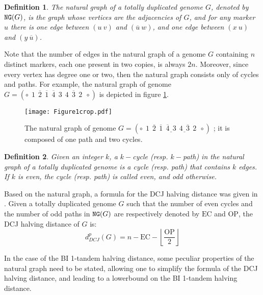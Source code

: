 \documentclass[11pt,final,twoside,nofrench]{thlifl}
\newcommand{\fst}[1]{ \ensuremath{#1} }
\newcommand{\snd}[1]{ \ensuremath{\overline{#1}} }
\newcommand\aff[2]{\ensuremath{(\fst{#1}~\fst{#2})}}
\newcommand\asf[2]{\ensuremath{(\snd{#1}~\fst{#2})}}
\newcommand\afs[2]{\ensuremath{(\fst{#1}~\snd{#2})}}
\renewcommand{\NG}{\ensuremath{\mbox{\texttt{NG}}}}
\newtheorem{definition}{Definition}
\begin{document}
\begin{definition}\emph{\cite{Mixtacki08}}
The natural graph of a totally duplicated genome $G$, denoted by $\NG(G)$, is the graph whose vertices are the \emph{adjacencies} of $G$, and for any marker $u$ there is one edge between  $\aff{u}{v}$ and  $\asf{u}{w}$, and  one edge between  $\aff{x}{u}$ and  $\afs{y}{u}$.

\end{definition}

Note that the number of edges in the natural graph of a genome $G$ containing $n$ distinct markers, each one present in two copies, is always $2n$. Moreover, since every vertex has degree one or two, then the natural graph consists only of cycles and paths. For example, the natural graph of genome $G = (\circ~~ \fst{1}~~\snd{2}~~\snd{1}~~\snd{4}~~\fst{3}~~\fst{4}~~\snd{3}~~\fst{2}~~\circ)$ is depicted in figure \ref{fig:NGdef}.

 
\begin{figure}[htbp]
    \centering

\texttt{[image: Figure1crop.pdf]}

\caption{The natural graph of genome $G = (\circ~~ \fst{1}~~\snd{2}~~\snd{1}~~\underline{\snd{4}~~\fst{3}}~~\underline{\fst{4}~~\snd{3}}~~\fst{2}~~\circ)$ ; it is composed of one path and two cycles.}
\label{fig:NGdef}
\end{figure}

\begin{definition}
    Given an integer $k$, a \emph{$k-$cycle} (resp. \emph{$k-$path}) in the 
    natural graph of a totally duplicated genome is a cycle (resp. path) 
    that contains $k$ edges. If $k$ is even, the cycle (resp. path) is called 
   \emph{even}, and \emph{odd} otherwise.
\end{definition}

\def\EC{\ensuremath{\mbox{EC}}}
\def\OP{\ensuremath{\mbox{OP}}}

Based on the natural graph, a formula for the DCJ halving distance was given in \cite{Mixtacki08}. Given a totally duplicated genome $G$ such that the number of even cycles and the number of odd paths in $\NG(G)$
are respectively denoted by $\EC$  and $\OP$, the  DCJ halving distance of $G$ is:
    $$d^p_{DCJ}(G) = n - \EC - \left\lfloor \frac{\OP}{2} \right\rfloor $$

In the case of the BI 1-tandem halving distance, some peculiar properties of the natural graph need to be stated, allowing one to simplify the formula of the DCJ halving distance, and leading to a lowerbound on the BI 1-tandem halving distance.
\end{document}

